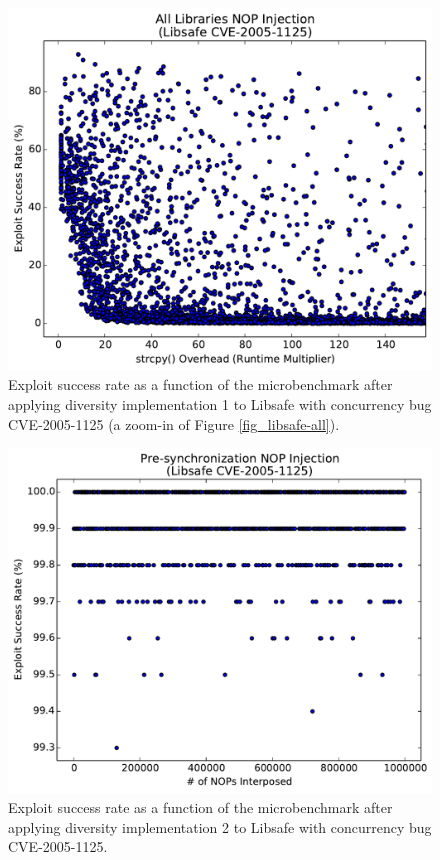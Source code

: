 \begin{figure}
	\centering
	\includegraphics[width=\columnwidth]{figures/libsafe-all-zoom}
	\caption{Exploit success rate as a function of the microbenchmark after applying diversity implementation 1 to Libsafe with concurrency bug CVE-2005-1125 (a zoom-in of Figure \ref{fig_libsafe-all}).}
	\label{fig_libsafe-all-zoom}
\end{figure}

\begin{figure}
	\centering
	\includegraphics[width=\columnwidth]{figures/libsafe-pre}
	\caption{Exploit success rate as a function of the microbenchmark after applying diversity implementation 2 to Libsafe with concurrency bug CVE-2005-1125.}
	\label{fig_libsafe-pre}
\end{figure}

